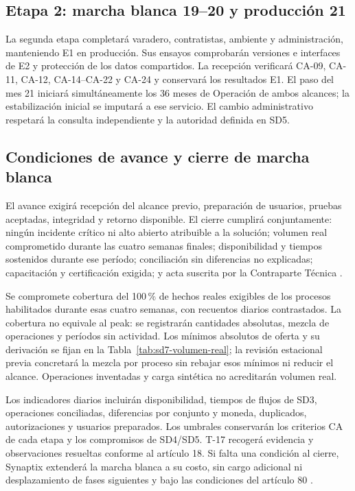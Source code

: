 \subsection{Etapa 2: marcha blanca 19--20 y producción 21} %
La segunda etapa completará varadero, contratistas, ambiente y administración, manteniendo E1 en producción. Sus ensayos comprobarán versiones e interfaces de E2 y protección de los datos compartidos. La recepción verificará CA-09, CA-11, CA-12, CA-14--CA-22 y CA-24 y conservará los resultados E1. El paso del mes 21 iniciará simultáneamente los 36 meses de Operación de ambos alcances; la estabilización inicial se imputará a ese servicio. El cambio administrativo respetará la consulta independiente y la autoridad definida en SD5.




\subsection{Condiciones de avance y cierre de marcha blanca} %
El avance exigirá recepción del alcance previo, preparación de usuarios, pruebas aceptadas, integridad y retorno disponible. El cierre cumplirá conjuntamente: ningún incidente crítico ni alto abierto atribuible a la solución; volumen real comprometido durante las cuatro semanas finales; disponibilidad y tiempos sostenidos durante ese período; conciliación sin diferencias no explicadas; capacitación y certificación exigida; y acta suscrita por la Contraparte Técnica \parencite[art.~17.3, p.~13]{bases-admin}.

Se compromete cobertura del 100\,\% de hechos reales exigibles de los procesos habilitados durante esas cuatro semanas, con recuentos diarios contrastados. La cobertura no equivale al peak: se registrarán cantidades absolutas, mezcla de operaciones y períodos sin actividad. Los mínimos absolutos de oferta y su derivación se fijan en la Tabla~\ref{tab:sd7-volumen-real}; la revisión estacional previa concretará la mezcla por proceso sin rebajar esos mínimos ni reducir el alcance. Operaciones inventadas y carga sintética no acreditarán volumen real.

Los indicadores diarios incluirán disponibilidad, tiempos de flujos de SD3, operaciones conciliadas, diferencias por conjunto y moneda, duplicados, autorizaciones y usuarios preparados. Los umbrales conservarán los criterios CA de cada etapa y los compromisos de SD4/SD5. T-17 recogerá evidencia y observaciones resueltas conforme al artículo 18. Si falta una condición al cierre, Synaptix extenderá la marcha blanca a su costo, sin cargo adicional ni desplazamiento de fases siguientes y bajo las condiciones del artículo 80 \parencite[arts.~17.3 y 18, p.~13]{bases-admin}.




